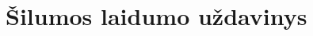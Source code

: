 \documentclass{VUMIFPSbakalaurinis}
\begin{document}






\section{Šilumos laidumo uždavinys}
\end{document}
